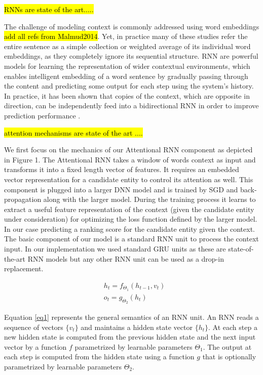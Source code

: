 \documentclass[11pt]{article}
\begin{document}
\hl{RNNs are state of the art..... }

The challenge of modeling context is commonly addressed using word embeddings \cite{} \hl{add all refs from Malmud2014}. Yet, in practice many of these studies refer the entire sentence as a simple collection or weighted average of its individual word embeddings, as they completely ignore its sequential structure. RNN are powerful models for learning the representation of wider contextual environments, which enables intelligent embedding of a word sentence by gradually passing through the content and predicting some output for each step using the system's history. In practice, it has been shown that copies of the context, which are opposite in direction, can be independently feed into a bidirectional RNN in order to improve prediction performance \cite{Munich2004c}. 

\hl{attention mechanisms are state of the art ....}

We first focus on the mechanics of our Attentional RNN component as depicted in Figure 1. The Attentional RNN takes a window of words context as input and transforms it into a fixed length vector of features. It requires an embedded vector representation for a candidate entity to control its attention as well. This component is plugged into a larger DNN model and is trained by SGD and back-propagation along with the larger model. During the training process it learns to extract a useful feature representation of the context (given the candidate entity under consideration) for optimizing the loss function defined by the larger model. In our case predicting a ranking score for the candidate entity given the context.
The basic component of our model is a standard RNN unit to process the context input. In our implementation we used standard GRU units \cite{cho2014learning} as these are state-of-the-art RNN models but any other RNN unit can be used as a drop-in replacement. 

\begin{equation}
	\label{eq1}
	\begin{aligned}
		& h_t=f_{\Theta_1}(h_{t-1}, v_t) \\
		& o_t=g_{\Theta_2}(h_t)
	\end{aligned}
\end{equation}

Equation \ref{eq1} represents the general semantics of an RNN unit. An RNN reads a sequence of vectors $\{v_t\}$ and maintains a hidden state vector $\{h_t\}$. At each step a new hidden state is computed from the previous hidden state and the next input vector by a function $f$ parametrized by learnable parameters $\Theta_1$. The output at each step is computed from the hidden state using a function $g$ that is optionally parametrized by learnable parameters $\Theta_2$. 
\end{document}
